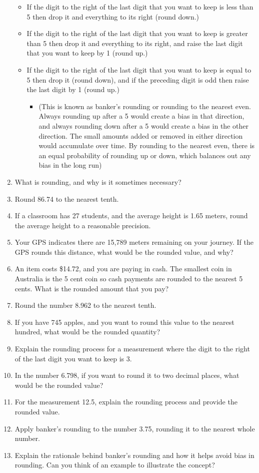 \documentclass{article}
\begin{document}
\begin{enumerate}
\begin{itemize}
\item If the digit to the right of the last digit that you want to keep is less than 5 then drop it and everything to its right (round down.)
\item If the digit to the right of the last digit that you want to keep is greater than 5 then drop it and everything to its right, and raise the last digit that you want to keep by 1 (round up.)
\item If the digit to the right of the last digit that you want to keep is equal to 5 then drop it (round down), and if the preceding digit is odd then raise the last digit by 1 (round up.)
\begin{itemize}
    \item [](This is known as banker's rounding or rounding to the nearest even. Always rounding up after a 5 would create a bias in that direction, and always rounding down after a 5 would create a bias in the other direction. The small amounts added or removed in either direction would accumulate over time. By rounding to the nearest even, there is an equal probability of rounding up or down, which balances out any bias in the long run)
\end{itemize}
\end{itemize}

\item What is rounding, and why is it sometimes necessary?
\item Round 86.74 to the nearest tenth.
\item If a classroom has 27 students, and the average height is 1.65 meters, round the average height to a reasonable precision.
\item Your GPS indicates there are 15,789 meters remaining on your journey. If the GPS rounds this distance, what would be the rounded value, and why?
\item An item costs \$14.72, and you are paying in cash. The smallest coin in Australia is the 5 cent coin so cash payments are rounded to the nearest 5 cents. What is the rounded amount that you pay?
\item Round the number 8.962 to the nearest tenth.
\item If you have 745 apples, and you want to round this value to the nearest hundred, what would be the rounded quantity?
\item Explain the rounding process for a measurement where the digit to the right of the last digit you want to keep is 3.
\item In the number 6.798, if you want to round it to two decimal places, what would be the rounded value?
\item For the measurement 12.5, explain the rounding process and provide the rounded value.
\item Apply banker's rounding to the number 3.75, rounding it to the nearest whole number.
\item Explain the rationale behind banker's rounding and how it helps avoid bias in rounding. Can you think of an example to illustrate the concept?

\end{enumerate}
\end{document}
